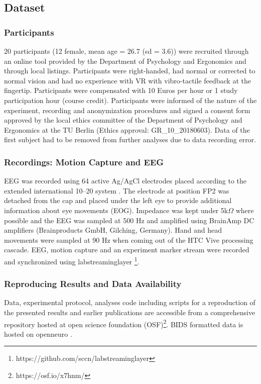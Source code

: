 
\subsection{Dataset}

\subsubsection{Participants}
20 participants (12 female, mean age = 26.7 (sd = 3.6)) were recruited through an online tool provided by the Department of Psychology and Ergonomics and through local listings. Participants were right-handed, had normal or corrected to normal vision and had no experience with VR with vibro-tactile feedback at the fingertip. Participants were compensated with 10 Euros per hour or 1 study participation hour (course credit). Participants were informed of the nature of the experiment, recording and anonymization procedures and signed a consent form approved by the local ethics committee of the Department of Psychology and Ergonomics at the TU Berlin (Ethics approval: GR\_10\_20180603). Data of the first subject had to be removed from further analyses due to data recording error.

\subsubsection{Recordings: Motion Capture and EEG}
EEG was recorded using 64 active Ag/AgCl electrodes placed according to the extended international 10–20 system \cite{Chatrian1985-ys}. The electrode at position FP2 was detached from the cap and placed under the left eye to provide additional information about eye movements (EOG). Impedance was kept under 5k$\Omega$ where possible and the EEG was sampled at 500 Hz and amplified using BrainAmp DC amplifiers (Brainproducts GmbH, Gilching, Germany). Hand and head movements were sampled at 90 Hz when coming out of the HTC Vive processing cascade. EEG, motion capture and an experiment marker stream were recorded and synchronized using labstreaminglayer \footnote{https://github.com/sccn/labstreaminglayer}.

\subsubsection{Reproducing Results and Data Availability}
Data, experimental protocol, analyses code including scripts for a reproduction of the presented results and earlier publications are accessible from a comprehensive repository hosted at open science foundation (OSF)\footnote{https://osf.io/x7hnm/}. BIDS formatted data is hosted on openneuro \cite{ds003846:1.0.0}.

